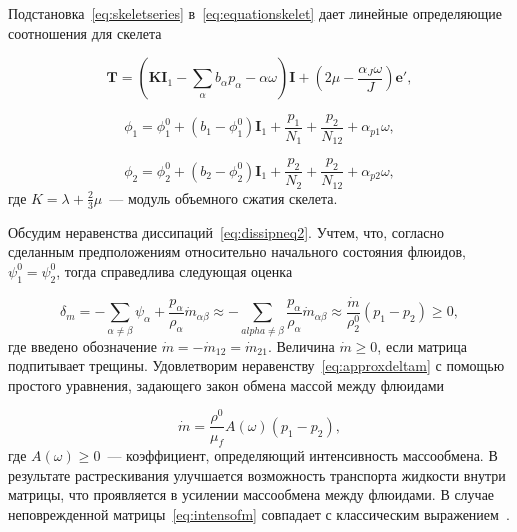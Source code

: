 Подстановка~\eqref{eq:skeletseries} в~\eqref{eq:equationskelet} дает линейные определяющие соотношения для скелета

\begin{equation}
  \label{eq:linequationskelet1}
  \textbf{T} = \left( \textbf{K} \textbf{I}_1 - \sum_{\alpha}{b_{\alpha}p_{\alpha} - \alpha \omega} \right) \textbf{I} + \left( 2\mu - \frac{\alpha_J \omega}{J} \right) \textbf{e}',
\end{equation}

\begin{equation}
  \label{eq:linequationskelet2}
  \phi_1 = \phi_1^0 + (b_1 - \phi_1^0) \textbf{I}_1 + \frac{p_1}{N_1} + \frac{p_2}{N_{12}} + \alpha_{p1} \omega,
\end{equation}

\begin{equation}
  \label{eq:linequationskelet3}
  \phi_2 = \phi_2^0 + (b_2 - \phi_2^0) \textbf{I}_1 + \frac{p_2}{N_2} + \frac{p_2}{N_{12}} + \alpha_{p2} \omega,
\end{equation}
где $K = \lambda + \frac{2}{3} \mu$~--- модуль объемного сжатия скелета.

Обсудим неравенства диссипаций~\eqref{eq:dissipneq2}. Учтем, что, согласно сделанным предположениям относительно начального состояния флюидов, $\psi_1^0 = \psi_2^0$, тогда справедлива следующая оценка

\begin{equation}
  \label{eq:approxdeltam}
  \delta_m = - \sum_{\alpha \neq \beta}{\psi_{\alpha} + \frac{p_{\alpha}}{\rho_{\alpha}}\dot{m}_{\alpha \beta}} \approx - \sum_{alpha \neq \beta}{\frac{p_{\alpha}}{\rho_{\alpha}}\dot{m}_{\alpha \beta}} \approx \frac{\dot{m}}{\rho_2^0}(p_1 - p_2) \geq 0,
\end{equation}
где введено обозначение $\dot{m} = - \dot{m}_{12} = \dot{m}_{21}$. Величина $\dot{m} \geq 0$, если матрица подпитывает трещины. Удовлетворим неравенству~\eqref{eq:approxdeltam} с помощью простого уравнения, задающего закон обмена массой между флюидами

\begin{equation}
  \label{eq:intensofm}
  \dot{m} = \frac{\rho^0}{\mu_f} A(\omega)(p_1 - p_2),
\end{equation}
где $A(\omega) \geq 0$~--- коэффициент, определяющий интенсивность массообмена. В результате растрескивания улучшается возможность транспорта жидкости внутри матрицы, что проявляется в усилении массообмена между флюидами. В случае неповрежденной матрицы~\eqref{eq:intensofm} совпадает с классическим выражением~\autocite{barenblatt1960basic}.


